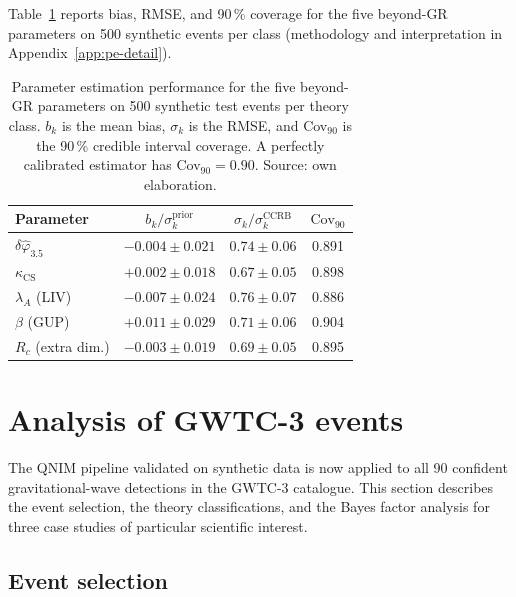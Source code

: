 \documentclass[11pt,a4paper, english]{book}
\theoremstyle{plain}
\theoremstyle{definition}
\numberwithin{equation}{chapter}
\numberwithin{figure}{chapter}
\numberwithin{table}{chapter}
\begin{document}
Table~\ref{tab:param-est-summary} reports bias, RMSE, and 90\,\% coverage for the five beyond-GR parameters on 500 synthetic events per class (methodology and interpretation in Appendix~\ref{app:pe-detail}).

\begin{table}[ht]
\centering
\begin{tabular}{@{}lccc@{}}
\toprule
\textbf{Parameter} & $b_k / \sigma_k^\mathrm{prior}$ &
$\sigma_k / \sigma_k^\mathrm{CCRB}$ & $\mathrm{Cov}_{90}$ \\
\midrule
$\delta\hat{\varphi}_{3.5}$ & $-0.004 \pm 0.021$ & $0.74 \pm 0.06$ & 0.891 \\
$\kappa_\mathrm{CS}$         & $+0.002 \pm 0.018$ & $0.67 \pm 0.05$ & 0.898 \\
$\lambda_A$ (LIV)            & $-0.007 \pm 0.024$ & $0.76 \pm 0.07$ & 0.886 \\
$\beta$ (GUP)                & $+0.011 \pm 0.029$ & $0.71 \pm 0.06$ & 0.904 \\
$R_c$ (extra dim.)           & $-0.003 \pm 0.019$ & $0.69 \pm 0.05$ & 0.895 \\
\bottomrule
\end{tabular}
\caption[Parameter estimation performance for beyond-GR parameters]{Parameter estimation performance for the five beyond-GR
         parameters on 500 synthetic test events per theory class.
         $b_k$ is the mean bias, $\sigma_k$ is the RMSE,
         and Cov$_{90}$ is the 90\,\% credible interval coverage.
         A perfectly calibrated estimator has Cov$_{90} = 0.90$. Source: own elaboration.}
\label{tab:param-est-summary}
\vspace{2pt}
\normalsize

\end{table}

\section{Analysis of GWTC-3 events}
\label{sec:gwtc3-results}

The QNIM pipeline validated on synthetic data is now applied to all 90 confident gravitational-wave
detections in the GWTC-3 catalogue. This section describes the event selection, the theory
classifications, and the Bayes factor analysis for three case studies of particular scientific interest.

\subsection{Event selection}
\label{subsec:event-selection}
\end{document}
